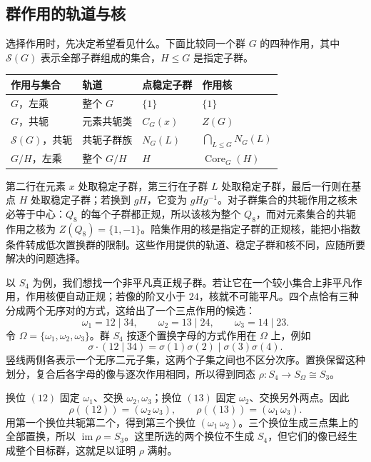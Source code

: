 \subsection{群作用的轨道与核}
\label{b1:subsec:0404:03}

选择作用时，先决定希望看见什么。下面比较同一个群 \(G\) 的四种作用，其中 \(\mathcal S(G)\) 表示全部子群组成的集合，\(H\leq G\) 是指定子群。
\begin{center}
	\begin{tabular}{llll}
		\toprule
		作用与集合 & 轨道 & 点稳定子群 & 作用核 \\
		\midrule
		\(G\)，左乘 & 整个 \(G\) & \(\{1\}\) & \(\{1\}\) \\
		\(G\)，共轭 & 元素共轭类 & \(C_G(x)\) & \(Z(G)\) \\
		\(\mathcal S(G)\)，共轭 & 共轭子群族 & \(N_G(L)\) & \(\bigcap_{L\leq G}N_G(L)\) \\
		\(G/H\)，左乘 & 整个 \(G/H\) & \(H\) & \(\operatorname{Core}_G(H)\) \\
		\bottomrule
	\end{tabular}
\end{center}
第二行在元素 \(x\) 处取稳定子群，第三行在子群 \(L\) 处取稳定子群，最后一行则在基点 \(H\) 处取稳定子群；若换到 \(gH\)，它变为 \(gHg^{-1}\)。对子群集合的共轭作用之核未必等于中心：\(Q_8\) 的每个子群都正规，所以该核为整个 \(Q_8\)，而对元素集合的共轭作用之核为 \(Z(Q_8)=\{1,-1\}\)。陪集作用的核是指定子群的正规核，能把小指数条件转成低次置换群的限制。这些作用提供的轨道、稳定子群和核不同，应随所要解决的问题选择。

\ProseParagraphBreak
以 \(S_4\) 为例，我们想找一个非平凡真正规子群。若让它在一个较小集合上非平凡作用，作用核便自动正规；若像的阶又小于 \(24\)，核就不可能平凡。四个点恰有三种分成两个无序对的方式，这给出了一个三点作用的候选：
\[
	\omega_1=12\mid34,\qquad \omega_2=13\mid24,\qquad \omega_3=14\mid23.
\]
令 \(\Omega=\{\omega_1,\omega_2,\omega_3\}\)。群 \(S_4\) 按逐个置换字母的方式作用在 \(\Omega\) 上，例如
\[
	\sigma\cdot(12\mid34) =\sigma(1)\sigma(2)\mid\sigma(3)\sigma(4).
\]
竖线两侧各表示一个无序二元子集，这两个子集之间也不区分次序。置换保留这种划分，复合后各字母的像与逐次作用相同，所以得到同态 \(\rho:S_4\rightarrow S_\Omega\cong S_3\)。

\ProseParagraphBreak
换位 \((12)\) 固定 \(\omega_1\)、交换 \(\omega_2,\omega_3\)；换位 \((13)\) 固定 \(\omega_2\)、交换另外两点。因此
\[
	\rho((12))=(\omega_2\,\omega_3),\qquad \rho((13))=(\omega_1\,\omega_3).
\]
用第一个换位共轭第二个，得到第三个换位 \((\omega_1\,\omega_2)\)。三个换位生成三点集上的全部置换，所以 \(\operatorname{im}\rho=S_3\)。这里所选的两个换位不生成 \(S_4\)，但它们的像已经生成整个目标群，这就足以证明 \(\rho\) 满射。

